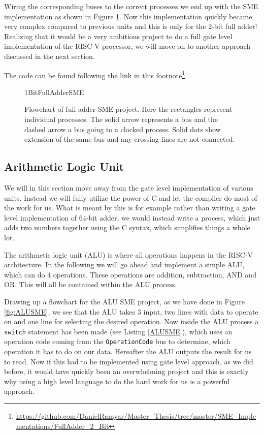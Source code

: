         Wiring the corresponding buses to the correct processes we end up with the SME implementation as shown in Figure \ref{fig:1BitFullAdderSME}. Now this implementation quickly became very complex compared to previous units and this is only for the 2-bit full adder! Realizing that it would
        be a very ambitious project to do a full gate level implementation of the RISC-V processor, we will move on to another approach discussed in the next section. 
        
        The code can be found following the link in this footnote\footnote{\url{https://github.com/DanielRamyar/Master_Thesis/tree/master/SME_Implementations/FullAdder_2_Bit}}  
    
        \begin{figure}[h!]
            \centering
            {1BitFullAdderSME}
            \caption{Flowchart of full adder SME project. Here the rectangles represent individual processes. The solid arrow represents a bus and the dashed arrow a bus going to a clocked process. Solid dots show extension of the same bus and any crossing lines are not connected.}
            \label{fig:1BitFullAdderSME}
        \end{figure}
    
    \subsection{Arithmetic Logic Unit}
        We will in this section move away from the gate level implementation of various units. Instead we will fully utilize the power of C and let the compiler do most of the work for us. What is meant by this is for example rather than writing a gate level implementation of 64-bit adder, we would instead write a process, which just adds two numbers together using the C syntax, which simplifies things a whole lot.
        
        The arithmetic logic unit (ALU) is where all operations happens in the RISC-V architecture. 
        In the following we will go ahead and implement a simple ALU, which can do 4 operations. These operations are addition, subtraction, AND and OR. This will all be contained within the ALU process.
        
        Drawing up a flowchart for the ALU SME project, as we have done in Figure \ref{fig:ALUSME}, we see that the ALU takes 3 input, two lines with data to operate on and one line for selecting the desired operation.
        Now inside the ALU process a \texttt{switch} statement has been made (see Listing \ref{ALUSME}), which uses an operation code coming from the \texttt{OperationCode} bus to determine, which operation it has to do on our data. Hereafter the ALU outputs the result for us to read.
        Now if this had to be implemented using gate level approach, as we did before, it would have quickly been an overwhelming project and this is exactly why using a high level language to do the hard work for us is a powerful approach.
        
